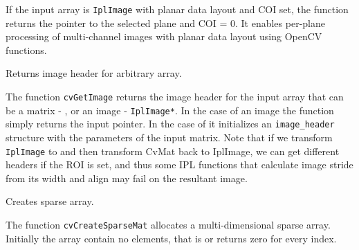 If the input array is \texttt{IplImage} with planar data layout and COI set, the function returns the pointer to the selected plane and COI = 0. It enables per-plane processing of multi-channel images with planar data layout using OpenCV functions.

\label{GetImage}

Returns image header for arbitrary array.


\begin{description}
\ifC
{}
\fi
\end{description}

The function \texttt{cvGetImage} returns the image header for the input array
that can be a matrix - , or an image - \texttt{IplImage*}. In
the case of an image the function simply returns the input pointer. In the
case of  it initializes an \texttt{image\_header} structure
with the parameters of the input matrix. Note that if we transform
\texttt{IplImage} to  and then transform CvMat back to
IplImage, we can get different headers if the ROI is set, and thus some
IPL functions that calculate image stride from its width and align may
fail on the resultant image.

\label{CreateSparseMat}

Creates sparse array.


\begin{description}
\ifC
{}
\else
{}
\fi
{}
\end{description}

The function \texttt{cvCreateSparseMat} allocates a multi-dimensional sparse array. Initially the array contain no elements, that is  or  returns zero for every index.

